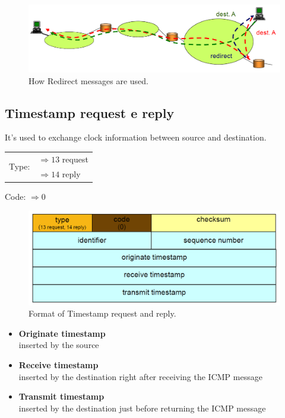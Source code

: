 \begin{figure}[H]
\centering
\includegraphics[scale=0.35, angle=0]{./Images/ICMP/Redirect_use}
\caption{\footnotesize{How Redirect messages are used.}}
\end{figure}

\subsection{Timestamp request e reply}
It's used to exchange clock information between source and destination.
\begin{table}[H]
\centering \footnotesize
\begin{tabular}{c|l}
\multirow{2}{*}{Type:} & {$\Rightarrow 13$ request}\\
& {$\Rightarrow 14$ reply}\\
\end{tabular}
\end{table}

\begin{center}
Code: $\Rightarrow 0$\\
\end{center}
\begin{figure}[H]
\centering
\includegraphics[scale=0.35, angle=0]{./Images/ICMP/Timestamp}
\caption{\footnotesize{Format of Timestamp request and reply.}}
\end{figure}
\begin{itemize}
\item{\textbf{Originate timestamp}\\
inserted by the source
}
\item{\textbf{Receive timestamp}\\
inserted by the destination right after receiving the ICMP message
}
\item{\textbf{Transmit timestamp}\\
inserted by the destination just before returning the ICMP message
}
\end{itemize}
